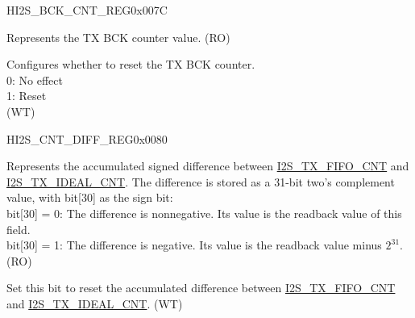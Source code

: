\begin{register}{H}{I2S\_BCK\_CNT\_REG}{0x007C}\label{regdesc:I2SBCKCNTREG}
%
%
\regnewline%
\begin{regdesc}\begin{reglist}
\label{fielddesc:I2STXBCKCNT}\item [I2S\_TX\_BCK\_CNT] Represents the TX BCK counter value. (RO)
\label{fielddesc:I2STXBCKCNTRST}\item [I2S\_TX\_BCK\_CNT\_RST] Configures whether to reset the TX BCK counter. \\
0: No effect\\
1: Reset\\
(WT)
\end{reglist}\end{regdesc}
\end{register}


\begin{register}{H}{I2S\_CNT\_DIFF\_REG}{0x0080}\label{regdesc:I2SCNTDIFFREG}
%
%
\regnewline%
\begin{regdesc}\begin{reglist}
\label{fielddesc:I2STXCNTDIFF}\item [I2S\_TX\_CNT\_DIFF] Represents the accumulated signed difference between \hyperref[fielddesc:I2STXFIFOCNT]{I2S\_TX\_FIFO\_CNT} and \hyperref[fielddesc:I2STXIDEALCNT]{I2S\_TX\_IDEAL\_CNT}. The difference is stored as a 31-bit two's complement value, with bit[30] as the sign bit:\\
bit[30] = 0: The difference is nonnegative. Its value is the readback value of this field.\\
bit[30] = 1: The difference is negative. Its value is the readback value minus $2^{31}$.\\
(RO)
\label{fielddesc:I2STXCNTDIFFRST}\item [I2S\_TX\_CNT\_DIFF\_RST] Set this bit to reset the accumulated difference between \hyperref[fielddesc:I2STXFIFOCNT]{I2S\_TX\_FIFO\_CNT} and \hyperref[fielddesc:I2STXIDEALCNT]{I2S\_TX\_IDEAL\_CNT}. (WT)
\end{reglist}\end{regdesc}
\end{register}


